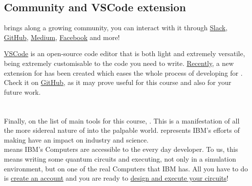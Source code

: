 \documentclass[aspectratio=43]{beamer}
\begin{document}
\subsection{Community and VSCode extension}
\begin{frame}
    \begin{card}[Community]
        \qk brings along a growing community, you can interact with it through \href{https://qiskit.slack.com/}{Slack}, \href{https://github.com/Qiskit}{GitHub}, \href{https://medium.com/qiskit}{Medium}, \href{https://www.facebook.com/qiskit/}{Facebook} and more!
    \end{card}
    \begin{card}
        \href{https://code.visualstudio.com/}{VSCode} is an open-source code editor that is both light and extremely versatile, being extremely customisable to the code you need to write. \href{https://medium.com/qiskit/qiskit-vscode-extension-a-new-tool-to-enhance-your-quantum-programming-experience-951cc8c1954b}{Recently}, a new extension for \qk has been created which eases the whole process of developing for \qk. Check it on \href{https://github.com/Qiskit/qiskit-vscode}{GitHub}, as it may prove useful for this course and also for your future work.
    \end{card}
\pagenumber
\end{frame}

\section{\ibmqe}
\begin{frame}{\ibmqe}
\begin{card}
    Finally, on the list of main tools for this course, \ibmqe. This is a manifestation of all the more sidereal nature of \qk into the palpable world. \ibmq represents IBM's efforts of making \qc have an impact on industry and science.\\
    \ibmqe means IBM's \q Computers are accessible to the every day developer. To us, this means writing some quantum circuits and executing, not only in a simulation environment, but on one of the real \q Computers that IBM has. All you have to do is \href{https://quantumexperience.ng.bluemix.net/qx/signup}{create an account} and you are ready to \href{https://quantumexperience.ng.bluemix.net/qx/editor}{design and execute your circuits}!
\end{card}
\pagenumber
\end{frame}
\end{document}
